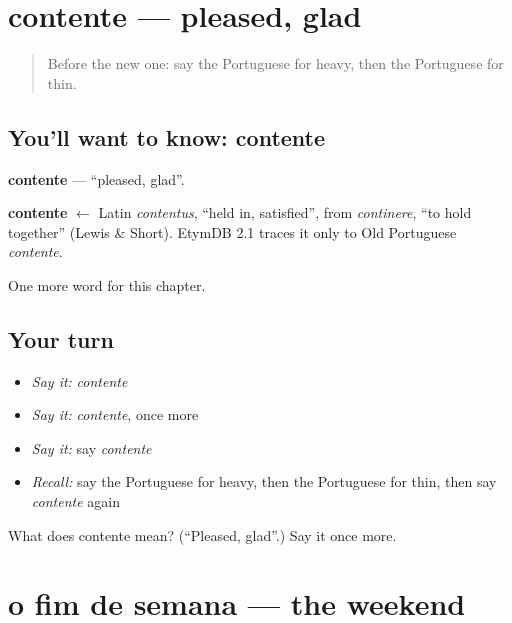 \section[contente]{contente — pleased, glad}

\label{lesson:PT-C128-contente}



\begin{quote}
Before the new one: say the Portuguese for heavy, then the Portuguese for thin.
\end{quote}

\subsection*{You'll want to know: contente}
\textbf{contente} — \textquotedblleft{}pleased, glad\textquotedblright{}.

\begin{cousinweb}
\textbf{contente} $\leftarrow$ Latin \emph{contentus}, \textquotedblleft{}held in, satisfied\textquotedblright{}, from \emph{continere}, \textquotedblleft{}to hold together\textquotedblright{} (Lewis \& Short). EtymDB 2.1 traces it only to Old Portuguese \emph{contente}.
\end{cousinweb}

\begin{grammarlens}[title={What you've built}]
One more word for this chapter.
\end{grammarlens}

\subsection*{Your turn}
\begin{itemize}
\raggedright
  \item \emph{Say it:} \emph{contente}
  \item \emph{Say it:} \emph{contente}, once more
  \item \emph{Say it:} say \emph{contente}
  \item \emph{Recall:} say the Portuguese for heavy, then the Portuguese for thin, then say \emph{contente} again
\end{itemize}

\begin{tcolorbox}[breakable,colback=teal!4,colframe=teal!35!black,title={Before you move on}]
What does contente mean? (\textquotedblleft{}Pleased, glad\textquotedblright{}.) Say it once more.
\end{tcolorbox}
\section[o fim de semana]{o fim de semana — the weekend}

